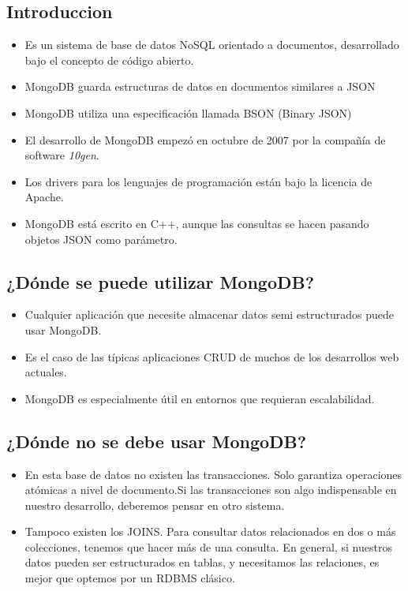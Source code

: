\documentclass[4paper]{article}
\begin{document}
\subsection{Introduccion}
\begin{itemize}
\item Es un sistema de base de datos NoSQL orientado a documentos, desarrollado bajo el concepto de código abierto.
\item MongoDB guarda estructuras de datos en documentos similares a JSON 
\item MongoDB utiliza una especificación llamada BSON (Binary JSON)
\item El desarrollo de MongoDB empezó en octubre de 2007 por la compañía de software \textit{10gen}.
\item Los drivers para los lenguajes de programación están bajo la licencia de Apache. 
\item MongoDB está escrito en C++, aunque las consultas se hacen pasando objetos JSON como parámetro.
\end{itemize}



\subsection{¿Dónde se puede utilizar MongoDB?}
\begin{itemize}
\item Cualquier aplicación que necesite almacenar datos semi estructurados puede usar MongoDB.
\item Es el caso de las típicas aplicaciones CRUD de muchos de los desarrollos web actuales.
\item MongoDB es especialmente útil en entornos que requieran escalabilidad. 
\end{itemize}

\subsection{¿Dónde no se debe usar MongoDB?}
\begin{itemize}
\item En esta base de datos no existen las transacciones. Solo garantiza operaciones atómicas a nivel de documento.Si las transacciones son algo indispensable en nuestro desarrollo, deberemos pensar en otro sistema.
\item Tampoco existen los JOINS. Para consultar datos relacionados en dos o más colecciones, tenemos que hacer más de una consulta. En general, si nuestros datos pueden ser estructurados en tablas, y necesitamos las relaciones, es mejor que optemos por un RDBMS clásico.
\end{itemize}
\end{document}
